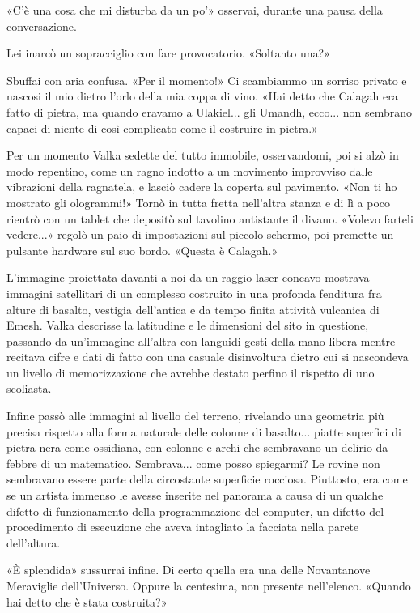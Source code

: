 «C'è una cosa che mi disturba da un po'» osservai, durante una pausa
della conversazione.

Lei inarcò un sopracciglio con fare provocatorio. «Soltanto una?»

Sbuffai con aria confusa. «Per il momento!» Ci scambiammo un sorriso
privato e nascosi il mio dietro l'orlo della mia coppa di vino. «Hai
detto che Calagah era fatto di pietra, ma quando eravamo a Ulakiel...
gli Umandh, ecco... non sembrano capaci di niente di così complicato
come il costruire in pietra.»

Per un momento Valka sedette del tutto immobile, osservandomi, poi si
alzò in modo repentino, come un ragno indotto a un movimento improvviso
dalle vibrazioni della ragnatela, e lasciò cadere la coperta sul
pavimento. «Non ti ho mostrato gli ologrammi!» Tornò in tutta fretta
nell'altra stanza e di lì a poco {rientrò} con un tablet che depositò
sul tavolino antistante il divano. «Volevo farteli vedere...» regolò un
paio di impostazioni sul piccolo schermo, poi premette un pulsante
hardware sul suo bordo. «Questa è Calagah.»

L'immagine proiettata davanti a noi da un raggio laser concavo mostrava
immagini satellitari di un complesso costruito in una profonda fenditura
fra alture di basalto, vestigia dell'antica e da tempo finita attività
vulcanica di Emesh. Valka descrisse la latitudine e le dimensioni del
sito in questione, passando da un'immagine all'altra con languidi gesti
della mano libera mentre recitava cifre e dati di fatto con una casuale
disinvoltura dietro cui si nascondeva un livello di memorizzazione che
avrebbe destato perfino il rispetto di uno scoliasta.

Infine passò alle immagini al livello del terreno, rivelando una
geometria più precisa rispetto alla forma naturale delle colonne di
basalto... piatte superfici di pietra nera come ossidiana, con colonne e
archi che sembravano un delirio da febbre di un matematico. Sembrava...
come posso spiegarmi? Le rovine non sembravano essere parte della
circostante superficie rocciosa. Piuttosto, era come se un artista
immenso le avesse inserite nel panorama a causa di un qualche difetto di
funzionamento della programmazione del computer, un difetto del
procedimento di esecuzione che aveva intagliato la facciata nella parete
dell'altura.

«È splendida» sussurrai infine. Di certo quella era una delle
Novantanove Meraviglie dell'Universo. Oppure la centesima, non presente
nell'elenco. «Quando hai detto che è stata costruita?»

